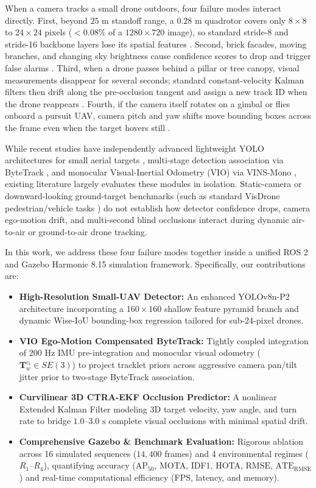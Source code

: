 \documentclass[conference]{IEEEtran}
\begin{document}
When a camera tracks a small drone outdoors, four failure modes interact directly. First, beyond $25\text{ m}$ standoff range, a $0.28\text{ m}$ quadrotor covers only $8 \times 8$ to $24 \times 24$ pixels ($<0.08\%$ of a $1280 \times 720$ image), so standard stride-8 and stride-16 backbone layers lose its spatial features \cite{ref1, ref4}. Second, brick facades, moving branches, and changing sky brightness cause confidence scores to drop and trigger false alarms \cite{ref5, ref6}. Third, when a drone passes behind a pillar or tree canopy, visual measurements disappear for several seconds; standard constant-velocity Kalman filters then drift along the pre-occlusion tangent and assign a new track ID when the drone reappears \cite{ref9, ref10}. Fourth, if the camera itself rotates on a gimbal or flies onboard a pursuit UAV, camera pitch and yaw shifts move bounding boxes across the frame even when the target hovers still \cite{ref11, ref12}.

While recent studies have independently advanced lightweight YOLO architectures for small aerial targets \cite{ref1, ref3, ref7, ref8}, multi-stage detection association via ByteTrack \cite{ref9}, and monocular Visual-Inertial Odometry (VIO) via VINS-Mono \cite{ref12}, existing literature largely evaluates these modules in isolation. Static-camera or downward-looking ground-target benchmarks (such as standard VisDrone pedestrian/vehicle tasks \cite{ref2}) do not establish how detector confidence drops, camera ego-motion drift, and multi-second blind occlusions interact during dynamic air-to-air or ground-to-air drone tracking.

In this work, we address these four failure modes together inside a unified ROS 2 and Gazebo Harmonic 8.15 simulation framework. Specifically, our contributions are:
\begin{itemize}
    \item \textbf{High-Resolution Small-UAV Detector:} An enhanced YOLOv8n-P2 architecture incorporating a $160 \times 160$ shallow feature pyramid branch and dynamic Wise-IoU bounding-box regression tailored for sub-24-pixel drones.
    \item \textbf{VIO Ego-Motion Compensated ByteTrack:} Tightly coupled integration of $200\text{ Hz}$ IMU pre-integration and monocular visual odometry ($\mathbf{T}_{w}^{c_t} \in SE(3)$) to project tracklet priors across aggressive camera pan/tilt jitter prior to two-stage ByteTrack association.
    \item \textbf{Curvilinear 3D CTRA-EKF Occlusion Predictor:} A nonlinear Extended Kalman Filter modeling 3D target velocity, yaw angle, and turn rate to bridge $1.0\text{--}3.0\text{ s}$ complete visual occlusions with minimal spatial drift.
    \item \textbf{Comprehensive Gazebo \& Benchmark Evaluation:} Rigorous ablation across 16 simulated sequences ($14,400$ frames) and 4 environmental regimes ($R_1\text{--}R_4$), quantifying accuracy ($\text{AP}_{50}$, MOTA, IDF1, HOTA, $\text{RMSE}$, $\text{ATE}_{\text{RMSE}}$) and real-time computational efficiency (FPS, latency, and memory).
\end{itemize}
\end{document}
